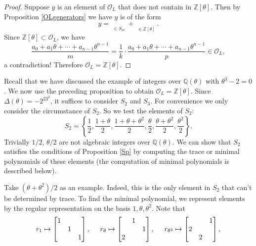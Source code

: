 \begin{proof}
Suppose $y$ is an element of $\mathcal{O}_L$ that does not contain in $\mathbb{Z}[\theta]$. Then by Proposition \ref{OLgenerators} we have $y$ is of the form 
$$
y=\mathop {\underbrace{\left( \frac{a_0+a_1\theta +\cdots +a_{n-1}\theta ^{n-1}}{m} \right) }} \limits_{\in S_m}+\mathop {\underbrace{\left( q_0+q_1\theta +\cdots +q_{n-1}\theta ^{n-1} \right) }} \limits_{\in \mathbb{Z} \left[ \theta \right]}.
$$
Since $\mathbb{Z}[\theta]\subset\mathcal{O}_L$, we have 
$$
\frac{a_0+a_1\theta +\cdots +a_{n-1}\theta ^{n-1}}{m}=\frac{1}{k}\cdot \frac{a_0+a_1\theta +\cdots +a_{n-1}\theta ^{n-1}}{p}\in \mathcal{O} _L,
$$
a contradiction! Therefore $\mathcal{O}_L=\mathbb{Z}[\theta]$.
\end{proof}
Recall that we have discussed the example of integers over $\mathbb{Q}(\theta)$ with $\theta^3-2=0$. We now use the preceding proposition to obtain $\mathcal{O}_L=\mathbb{Z}[\theta]$. Since $\Delta(\theta)=-2^23^2$, it suffices to consider $S_2$ and $S_3$. For convenience we only consider the circumstance of $S_2$. So we test the elements of $S_2$:
$$
S_2=\left\{ \frac{1}{2},\frac{1+\theta}{2},\frac{1+\theta +\theta ^2}{2},\frac{\theta}{2},\frac{\theta +\theta ^2}{2},\frac{\theta ^2}{2} \right\} .
$$
Trivially $1/2$, $\theta/2$ are not algebraic integers over $\mathbb{Q}(\theta)$. We can show that $S_2$ satisfies the conditions of Proposition \ref{Sp} by computing the trace or minimal polynomials of these elements (the computation of minimal polynomials is described below).\par
Take $(\theta+\theta^2)/2$ as an example. Indeed, this is the only element in $S_2$ that can't be determined by trace. To find the minimal polynomial, we represent elements by the regular representation on the basis $1,\theta,\theta^2$. Note that 
$$
r_1\mapsto \left[ \begin{matrix}
	1&		&		\\
	&		1&		\\
	&		&		1\\
\end{matrix} \right] ,\hspace{0.5cm}r_{\theta}\mapsto \left[ \begin{matrix}
	&		1&		\\
	&		&		1\\
	2&		&		\\
\end{matrix} \right] ,\hspace{0.5cm}r_{\theta ^2}\mapsto \left[ \begin{matrix}
	&		&		1\\
	2&		&		\\
	&		2&		\\
\end{matrix} \right] ,
$$
